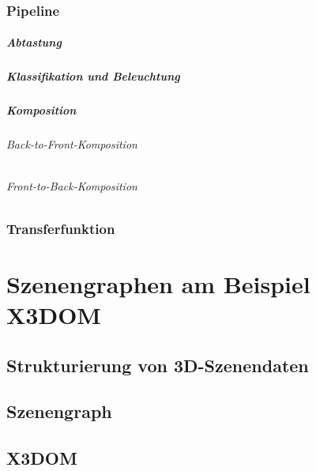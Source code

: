 \documentclass[a4paper, 11pt, accentcolor = tud3b]{tudreport}
\begin{document}
			\subsection{Pipeline} %

				\paragraph{Abtastung} %

				\paragraph{Klassifikation und Beleuchtung} %

				\paragraph{Komposition} %

					\subparagraph{Back-to-Front-Komposition} %

					\subparagraph{Front-to-Back-Komposition} %

			\subsection{Transferfunktion} %

	\chapter{Szenengraphen am Beispiel X3DOM} %

		\section{Strukturierung von 3D-Szenendaten} %

		\section{Szenengraph} %

		\section{X3DOM} %
\end{document}
